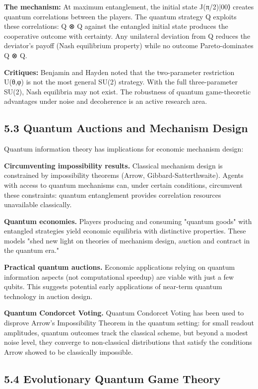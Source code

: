 \documentclass[11pt]{article}
\begin{document}
\textbf{The mechanism:} At maximum entanglement, the initial state J(π/2)|00⟩ creates
quantum correlations between the players. The quantum strategy Q exploits these
correlations: Q ⊗ Q against the entangled initial state produces the cooperative
outcome with certainty. Any unilateral deviation from Q reduces the deviator's
payoff (Nash equilibrium property) while no outcome Pareto-dominates Q ⊗ Q.

\textbf{Critiques:} Benjamin and Hayden noted that the two-parameter restriction
U(θ,φ) is not the most general SU(2) strategy. With the full three-parameter
SU(2), Nash equilibria may not exist. The robustness of quantum game-theoretic
advantages under noise and decoherence is an active research area.
\subsection{5.3 Quantum Auctions and Mechanism Design}
\label{sec:orgacd0062}

Quantum information theory has implications for economic mechanism design:

\textbf{Circumventing impossibility results.} Classical mechanism design is constrained
by impossibility theorems (Arrow, Gibbard-Satterthwaite). Agents with access to
quantum mechanisms can, under certain conditions, circumvent these constraints:
quantum entanglement provides correlation resources unavailable classically.

\textbf{Quantum economies.} Players producing and consuming "quantum goods" with
entangled strategies yield economic equilibria with distinctive properties.
These models "shed new light on theories of mechanism design, auction and
contract in the quantum era."

\textbf{Practical quantum auctions.} Economic applications relying on quantum
information aspects (not computational speedup) are viable with just a few
qubits. This suggests potential early applications of near-term quantum
technology in auction design.

\textbf{Quantum Condorcet Voting.} Quantum Condorcet Voting has been used to disprove
Arrow's Impossibility Theorem in the quantum setting: for small readout
amplitudes, quantum outcomes track the classical scheme, but beyond a modest
noise level, they converge to non-classical distributions that satisfy the
conditions Arrow showed to be classically impossible.
\subsection{5.4 Evolutionary Quantum Game Theory}
\label{sec:org084932c}
\end{document}
